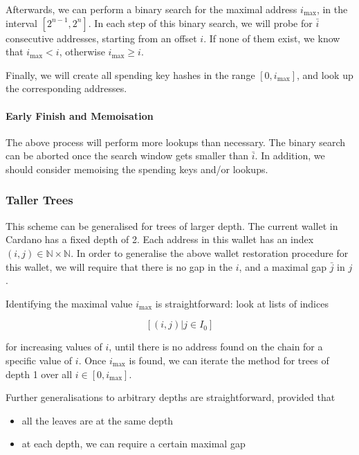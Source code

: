\documentclass[11pt,a4paper,dvipsnames,twosided]{article}
\begin{document}
Afterwards, we can perform a binary search for the maximal address
\(i_\text{max}\), in the interval \([2^{n-1}, 2^n]\). In each step of
this binary search, we will probe for \(\bar{i}\) consecutive addresses,
starting from an offset \(i\). If none of them exist, we know that
\(i_\text{max} < i\), otherwise \(i_\text{max} \geq i\).

Finally, we will create all spending key hashes in the range
\([0, i_\text{max}]\), and look up the corresponding addresses.

\paragraph{Early Finish and Memoisation}

The above process will perform more lookups than necessary. The binary
search can be aborted once the search window gets smaller than
\(\bar{i}\). In addition, we should consider memoising the spending keys
and/or lookups.

\subsubsection{Taller Trees}
\label{taller-trees}

This scheme can be generalised for trees of larger depth. The current
wallet in Cardano has a fixed depth of 2. Each address in this wallet
has an index \((i, j) \in \mathbb{N} \times \mathbb{N}\). In order to
generalise the above wallet restoration procedure for this wallet, we
will require that there is no gap in the \(i\), and a maximal gap
\(\bar{j}\) in \(j\).

Identifying the maximal value \(i_\text{max}\) is straightforward: look
at lists of indices

\[
[(i, j) | j \in I_0]
\]

for increasing values of \(i\), until there is no address found on the
chain for a specific value of \(i\). Once \(i_\text{max}\) is found, we
can iterate the method for trees of depth 1 over all
\(i \in [0, i_\text{max}]\).

Further generalisations to arbitrary depths are straightforward,
provided that

\begin{itemize}
\item
  all the leaves are at the same depth
\item
  at each depth, we can require a certain maximal gap
\end{itemize}
\end{document}
